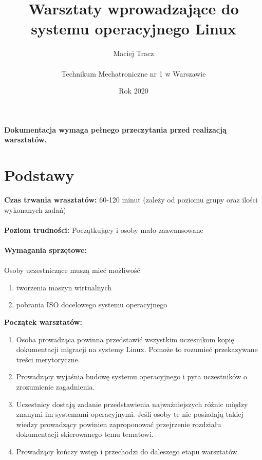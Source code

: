\documentclass[10pt,a4paper]{article}
\begin{document}
\title{\Huge Warsztaty wprowadzające do systemu operacyjnego Linux}
\author{Maciej Tracz \\\\Technikum Mechatroniczne nr 1 w Warszawie}
\date{Rok 2020}
\maketitle

\textbf{Dokumentacja wymaga pełnego przeczytania przed realizacją warsztatów.}

\tableofcontents

\newpage

\section{Podstawy}

\textbf{Czas trwania wrasztatów:} 60-120 minut (zależy od poziomu grupy oraz ilości wykonanych zadań)\\\\
\textbf{Poziom trudności:} Początkujący i osoby mało-zaawansowane\\\\

\textbf{Wymagania sprzętowe:} \\\\ Osoby uczestniczące muszą mieć możliwość
\begin{enumerate}
\item tworzenia maszyn wirtualnych
\item pobrania ISO docelowego systemu operacyjnego\\
\end{enumerate}

\textbf{Początek warsztatów:}
\begin{enumerate}
\item Osoba prowadząca powinna przedstawić wszystkim uczesnikom kopię dokumentacji migracji na systemy Linux. Pomoże to rozumieć przekazywane treści merytoryczne.
\item Prowadzący wyjaśnia budowę systemu operacyjnego i pyta uczestników o zrozumienie zagadnienia.
\item Uczestnicy dostają zadanie przedstawienia najważniejszych różnic między znanymi im systemami operacyjnymi. Jeśli osoby te nie posiadają takiej wiedzy prowadzący powinien zaproponować przejrzenie rozdziału dokumentacji skierowanego temu tematowi.
\item Prowadzący kończy wstęp i przechodzi do daleszego etapu warsztatów.
\end{enumerate}
\end{document}
